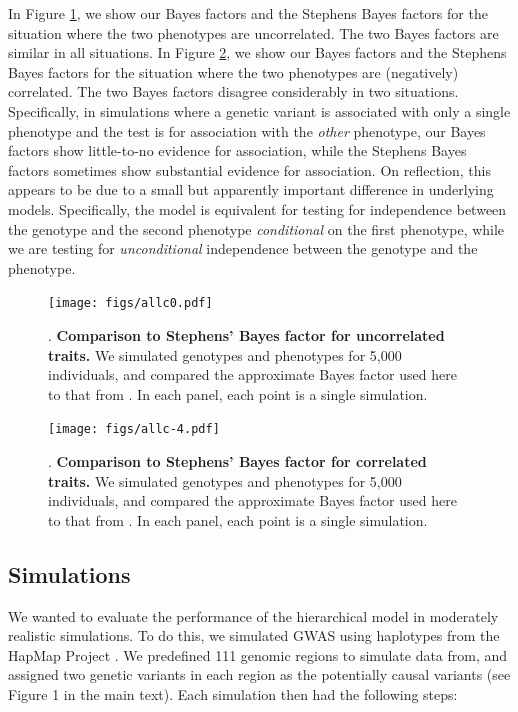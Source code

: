 \documentclass[11pt,titlepage]{article}
\begin{document}
In Figure \ref{f_c0}, we show our Bayes factors and the Stephens Bayes factors for the situation where the two phenotypes are uncorrelated. The two Bayes factors are similar in all situations. In Figure \ref{f_c-4}, we show our Bayes factors and the Stephens Bayes factors for the situation where the two phenotypes are (negatively) correlated. The two Bayes factors disagree considerably in two situations. Specifically, in simulations where a genetic variant is associated with only a single phenotype and the test is for association with the \emph{other} phenotype, our Bayes factors show little-to-no evidence for association, while the Stephens Bayes factors sometimes show substantial evidence for association. On reflection, this appears to be due to a small but apparently important difference in underlying models. Specifically, the \citet{Stephens:2013fk} model is equivalent for testing for independence between the genotype and the second phenotype \emph{conditional} on the first phenotype, while we are testing for \emph{unconditional} independence between the genotype and the phenotype.  

 
\begin{figure}
\begin{center}
\texttt{[image: figs/allc0.pdf]}
\caption{. \textbf{Comparison to Stephens' Bayes factor for uncorrelated traits.} We simulated genotypes and phenotypes for 5,000 individuals, and compared the approximate Bayes factor used here to that from \citet{Stephens:2013fk}. In each panel, each point is a single simulation. }\label{f_c0}
\end{center}
\end{figure}

\begin{figure}
\begin{center}
\texttt{[image: figs/allc-4.pdf]}
\caption{. \textbf{Comparison to Stephens' Bayes factor for correlated traits.} We simulated genotypes and phenotypes for 5,000 individuals, and compared the approximate Bayes factor used here to that from \citet{Stephens:2013fk}. In each panel, each point is a single simulation.}\label{f_c-4}
\end{center}
\end{figure}



\subsection{Simulations}
We wanted to evaluate the performance of the hierarchical model in moderately realistic simulations. To do this, we simulated GWAS using haplotypes from the HapMap Project \citep{Frazer:2007dz}. We predefined 111 genomic regions to simulate data from, and assigned two genetic variants in each region as the potentially causal variants (see Figure 1 in the main text). Each simulation then had the following steps:
\end{document}
